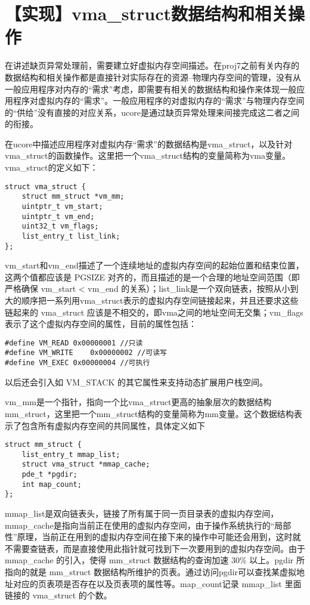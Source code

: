 \section{【实现】vma\_struct数据结构和相关操作}\label{ux5b9eux73b0vmaux5fstructux6570ux636eux7ed3ux6784ux548cux76f8ux5173ux64cdux4f5c}

在讲述缺页异常处理前，需要建立好虚拟内存空间描述。在proj7之前有关内存的数据结构和相关操作都是直接针对实际存在的资源--物理内存空间的管理，没有从一般应用程序对内存的``需求''考虑，即需要有相关的数据结构和操作来体现一般应用程序对虚拟内存的``需求''。一般应用程序的对虚拟内存的``需求''与物理内存空间的``供给''没有直接的对应关系，ucore是通过缺页异常处理来间接完成这二者之间的衔接。

在ucore中描述应用程序对虚拟内存``需求''的数据结构是vma\_struct，以及针对vma\_struct的函数操作。这里把一个vma\_struct结构的变量简称为vma变量。vma\_struct的定义如下：

\begin{lstlisting}
struct vma_struct {
    struct mm_struct *vm_mm;
    uintptr_t vm_start;
    uintptr_t vm_end;
    uint32_t vm_flags;
    list_entry_t list_link;
};
\end{lstlisting}

vm\_start和vm\_end描述了一个连续地址的虚拟内存空间的起始位置和结束位置，这两个值都应该是
PGSIZE 对齐的，而且描述的是一个合理的地址空间范围（即严格确保 vm\_start
\textless{} vm\_end
的关系）；list\_link是一个双向链表，按照从小到大的顺序把一系列用vma\_struct表示的虚拟内存空间链接起来，并且还要求这些链起来的
vma\_struct
应该是不相交的，即vma之间的地址空间无交集；vm\_flags表示了这个虚拟内存空间的属性，目前的属性包括：

\begin{lstlisting}
#define VM_READ 0x00000001 //只读
#define VM_WRITE    0x00000002 //可读写
#define VM_EXEC 0x00000004 //可执行
\end{lstlisting}

以后还会引入如 VM\_STACK 的其它属性来支持动态扩展用户栈空间。

vm\_mm是一个指针，指向一个比vma\_struct更高的抽象层次的数据结构mm\_struct，这里把一个mm\_struct结构的变量简称为mm变量。这个数据结构表示了包含所有虚拟内存空间的共同属性，具体定义如下

\begin{lstlisting}
struct mm_struct {
    list_entry_t mmap_list;
    struct vma_struct *mmap_cache;
    pde_t *pgdir;
    int map_count;
};
\end{lstlisting}

mmap\_list是双向链表头，链接了所有属于同一页目录表的虚拟内存空间，mmap\_cache是指向当前正在使用的虚拟内存空间，由于操作系统执行的``局部性''原理，当前正在用到的虚拟内存空间在接下来的操作中可能还会用到，这时就不需要查链表，而是直接使用此指针就可找到下一次要用到的虚拟内存空间。由于
mmap\_cache 的引入，使得 mm\_struct 数据结构的查询加速 30\% 以上。pgdir
所指向的就是 mm\_struct
数据结构所维护的页表。通过访问pgdir可以查找某虚拟地址对应的页表项是否存在以及页表项的属性等。map\_count记录
mmap\_list 里面链接的 vma\_struct 的个数。


